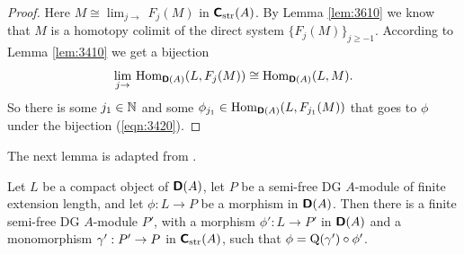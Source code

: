 \begin{proof}
Here $M \cong \lim_{j \to} \, F_j(M)$ in $\boldsymbol{\mathsf{C}}_{\mathrm{str}}(A)$. By Lemma 
\ref{lem:3610} we know that $M$ is a homotopy colimit of the direct system 
$\{ F_j(M) \}_{j \geq -1}$. According to Lemma \ref{lem:3410} we 
get a bijection 
\begin{equation} \label{eqn:3420}
\lim_{j \to} \, \operatorname{Hom}_{\boldsymbol{\mathsf{D}}(A)}(L, F_j(M)) \cong  
\operatorname{Hom}_{\boldsymbol{\mathsf{D}}(A)}(L, M) . 
\end{equation}
So there is some $j_1 \in \mathbb{N}$ and some 
$\phi_{j_1} \in \operatorname{Hom}_{\boldsymbol{\mathsf{D}}(A)}(L, F_{j_1}(M))$
that goes to $\phi$ under the bijection (\ref{eqn:3420}).
\end{proof}

The next lemma is adapted from \cite[Lemma tag=09R2]{SP}. 

\begin{lem} \label{lem:3412}
Let $L$ be a compact object of $\boldsymbol{\mathsf{D}}(A)$, let $P$ be a semi-free
DG $A$-module of finite extension length, and let $\phi : L \to P$ be a 
morphism 
in $\boldsymbol{\mathsf{D}}(A)$.
Then there is a finite semi-free DG $A$-module $P'$, with a morphism 
$\phi' : L \to P'$ in $\boldsymbol{\mathsf{D}}(A)$ and a monomorphism 
$\gamma' : P' \to P$ in $\boldsymbol{\mathsf{C}}_{\mathrm{str}}(A)$, such that 
$\phi = \operatorname{Q}(\gamma') \circ \phi'$. 
\end{lem}


